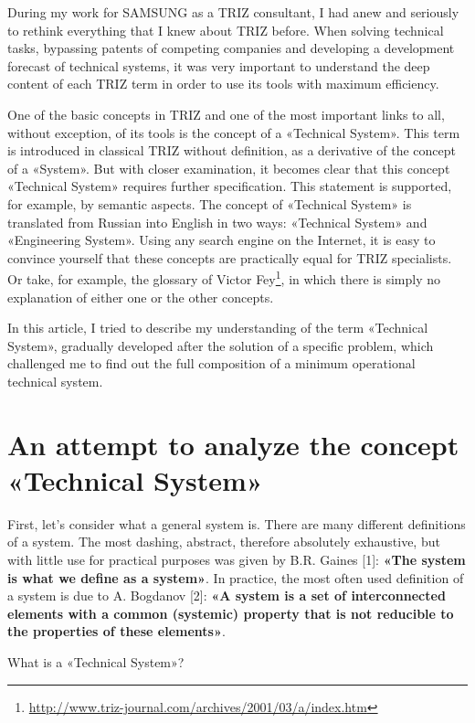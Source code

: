 \documentclass[11pt,a4paper]{article}
\begin{document}
During my work for SAMSUNG as a TRIZ consultant, I had anew and seriously to
rethink everything that I knew about TRIZ before. When solving technical
tasks, bypassing patents of competing companies and developing a development
forecast of technical systems, it was very important to understand the deep
content of each TRIZ term in order to use its tools with maximum efficiency.

One of the basic concepts in TRIZ and one of the most important links to all,
without exception, of its tools is the concept of a «Technical System». This
term is introduced in classical TRIZ without definition, as a derivative of
the concept of a «System». But with closer examination, it becomes clear that
this concept «Technical System» requires further specification. This statement
is supported, for example, by semantic aspects.  The concept of «Technical
System» is translated from Russian into English in two ways: «Technical
System» and «Engineering System». Using any search engine on the Internet, it
is easy to convince yourself that these concepts are practically equal for
TRIZ specialists. Or take, for example, the glossary of Victor
Fey\footnote{\url{http://www.triz-journal.com/archives/2001/03/a/index.htm}},
in which there is simply no explanation of either one or the other concepts.

In this article, I tried to describe my understanding of the term «Technical
System», gradually developed after the solution of a specific problem, which
challenged me to find out the full composition of a minimum operational
technical system.

\section*{An attempt to analyze the concept «Technical System»}

First, let's consider what a general system is. There are many different
definitions of a system. The most dashing, abstract, therefore absolutely
exhaustive, but with little use for practical purposes was given by
B.R. Gaines [1]: \textbf{«The system is what we define as a system»}. In
practice, the most often used definition of a system is due to A. Bogdanov
[2]: \textbf{«A system is a set of interconnected elements with a common
  (systemic) property that is not reducible to the properties of these
  elements»}.

What is a «Technical System»?
\end{document}
